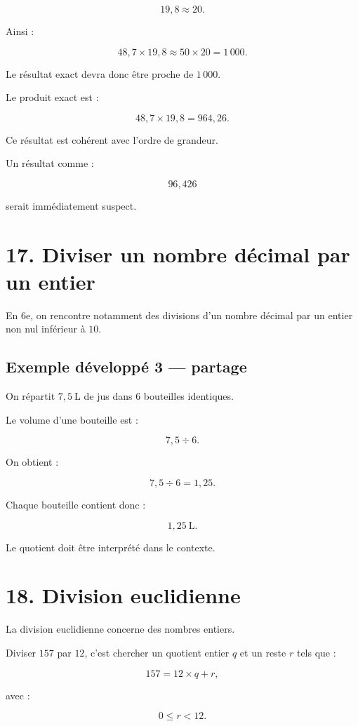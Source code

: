 \[
19{,}8\approx20.
\]

Ainsi :

\[
48{,}7\times19{,}8
\approx
50\times20
=
1\,000.
\]

Le résultat exact devra donc être proche de $1\,000$.

Le produit exact est :

\[
48{,}7\times19{,}8=964{,}26.
\]

Ce résultat est cohérent avec l’ordre de grandeur.

Un résultat comme :

\[
96{,}426
\]

serait immédiatement suspect.

\section{17. Diviser un nombre décimal par un entier}

En 6e, on rencontre notamment des divisions d’un nombre décimal par un entier non nul inférieur à $10$.

\subsection{Exemple développé 3 — partage}

On répartit $7{,}5\ \text{L}$ de jus dans $6$ bouteilles identiques.

Le volume d’une bouteille est :

\[
7{,}5\div6.
\]

On obtient :

\[
7{,}5\div6=1{,}25.
\]

Chaque bouteille contient donc :

\[
\boxed{1{,}25\ \text{L}}.
\]

Le quotient doit être interprété dans le contexte.

\section{18. Division euclidienne}

La division euclidienne concerne des nombres entiers.

Diviser $157$ par $12$, c’est chercher un quotient entier $q$ et un reste $r$ tels que :

\[
157=12\times q+r,
\]

avec :

\[
0\le r<12.
\]

